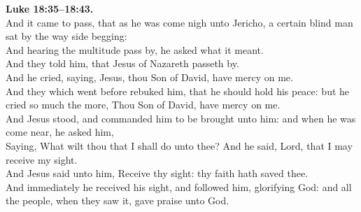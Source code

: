 \documentclass[12pt]{article} %
\begin{document}
{\begin{minipage}[t]{0.45\textwidth}
\textbf{Luke 18:35--18:43.}\\
And it came to pass, that as he was come nigh unto Jericho, a certain blind man sat by the way side begging:\\
And hearing the multitude pass by, he asked what it meant.\\
And they told him, that Jesus of Nazareth passeth by.\\
And he cried, saying, Jesus, thou Son of David, have mercy on me.\\
And they which went before rebuked him, that he should hold his peace: but he cried so much the more, Thou Son of David, have mercy on me.\\
And Jesus stood, and commanded him to be brought unto him: and when he was come near, he asked him,\\
Saying, What wilt thou that I shall do unto thee? And he said, Lord, that I may receive my sight.\\
And Jesus said unto him, Receive thy sight: thy faith hath saved thee.\\
And immediately he received his sight, and followed him, glorifying God: and all the people, when they saw it, gave praise unto God.\\

\end{minipage}}
\vspace*{\fill}
\newpage
\huge%
\vspace*{\fill}
\begin{spacing}{1.4}
\end{spacing}
\vspace*{\fill}
\end{document}
